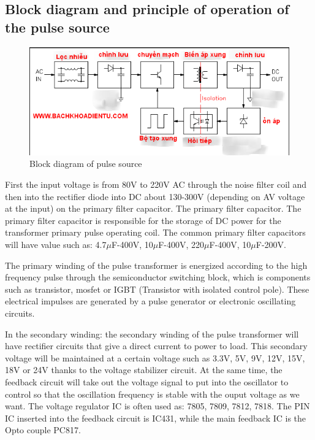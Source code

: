 \documentclass[a4paper]{report}
\begin{document}
    \subsection{Block diagram and principle of operation of the pulse source}
        \begin{figure}[ht]
            \centering
            \includegraphics[width=\linewidth]{diagram.png}
            \caption{\label{fig:boat}Block diagram of pulse source}
        \end{figure}
        First the input voltage is from 80V to 220V AC through the noise filter coil and then into the rectifier 
        diode into DC about 130-300V (depending on AV voltage at the input) on the primary filter capacitor. 
        The primary filter capacitor. The primary filter capacitor is responsible for the storage of DC power 
        for the transformer primary pulse operating coil. The common primary filter capacitors will have 
        value such as: 4.7$\mu$F-400V, 10$\mu$F-400V, 220$\mu$F-400V, 10$\mu$F-200V.
        \linebreak
        \par The primary winding of the pulse transformer is energized according to the high frequency pulse 
        through the semiconductor switching block, which is components such as transistor, mosfet or IGBT 
        (Transistor with isolated control pole). These electrical impulses are generated by a pulse generator 
        or electronic oscillating circuits.
        \linebreak
        \par In the secondary winding: the secondary winding of the pulse transformer will have rectifier 
        circuits that give a direct current to power to load. This secondary voltage will be maintained at 
        a certain voltage such as 3.3V, 5V, 9V, 12V, 15V, 18V or 24V thanks to the voltage stabilizer circuit. 
        At the same time, the feedback circuit will take out the voltage signal to put into the oscillator 
        to control so that the oscillation frequency is stable with the ouput voltage as we want. The voltage 
        regulator IC is often used as: 7805, 7809, 7812, 7818. The PIN IC inserted into the feedback circuit 
        is IC431, while the main feedback IC is the Opto couple PC817.
\end{document}
